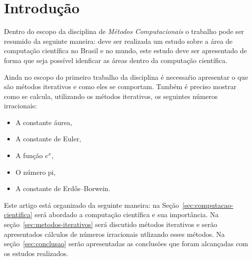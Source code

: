 \section*{Introdução}

	Dentro do escopo da disciplina de \emph{Métodos Computacionais} o trabalho
	pode ser resumido da seguinte maneira: deve ser realizada um estudo sobre a
	área de computação científica no Brasil e no mundo, este estudo deve ser
	apresentado de forma que seja possível idenficar as áreas dentro da
	computação científica.

	Ainda no escopo do primeiro trabalho da disciplina é necessaŕio apresentar o
	que são métodos iterativos e como eles se comportam. Também é preciso
	mostrar como se calcula, utilizando os métodos iterativos,  os seguintes
	números irracionais:

	\begin{itemize}
		\item A constante áurea,
		\item A constante de Euler,
		\item A função $e^x$,
		\item O número pi,
		\item A constante de Erdős–Borwein.
	\end{itemize}

	Este artigo está organizado da seguinte maneira: na
	Seção~\ref{sec:computacao-cientifica} será abordado a computação científica
	e sua importância. Na seção~\ref{sec:metodos-iterativos} será discutido
	métodos iterativos e serão apresentados cálculos de números irracionais
	utlizando esses métodos. Na seção~\ref{sec:conclusao} serão apresentadas as
	conclusões que foram alcançadas com os estudos realizados.
